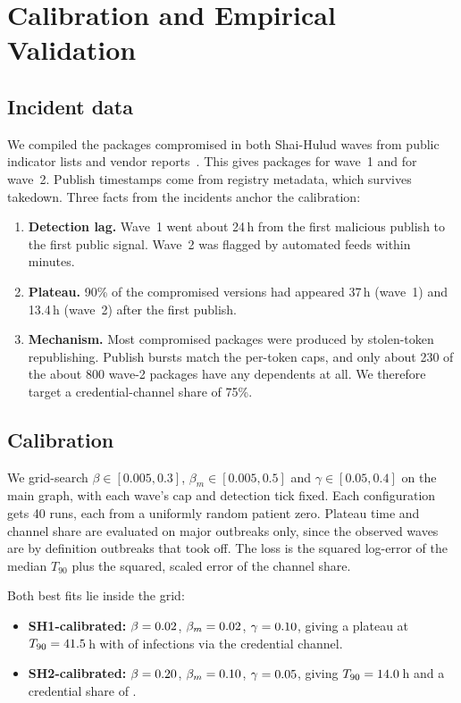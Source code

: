 \section{Calibration and Empirical Validation}\label{sec:calibration}

\subsection{Incident data}
We compiled the packages compromised in both Shai-Hulud waves from public indicator lists and vendor
reports~\citep{stepsecurity2025shaihulud,socket2025shaihulud,wiz2025shaihulud2,datadog2025shaihulud2}.
This gives \ValOneListed{} packages for wave~1 and \ValTwoListed{} for wave~2. Publish timestamps come
from registry metadata, which survives takedown. Three facts from the incidents anchor the calibration:
\begin{enumerate}
  \item \textbf{Detection lag.} Wave~1 went about 24\,h from the first malicious publish to the first
        public signal. Wave~2 was flagged by automated feeds within minutes.
  \item \textbf{Plateau.} 90\% of the compromised versions had appeared 37\,h (wave~1) and 13.4\,h
        (wave~2) after the first publish.
  \item \textbf{Mechanism.} Most compromised packages were produced by stolen-token republishing.
        Publish bursts match the per-token caps, and only about 230 of the about 800 wave-2 packages have
        any dependents at all. We therefore target a credential-channel share of 75\%.
\end{enumerate}

\subsection{Calibration}
We grid-search $\beta\in[0.005,0.3]$, $\beta_m\in[0.005,0.5]$ and $\gamma\in[0.05,0.4]$ on the main graph,
with each wave's cap and detection tick fixed. Each configuration gets 40 runs, each from a uniformly
random patient zero. Plateau time and channel share are evaluated on major outbreaks only, since the
observed waves are by definition outbreaks that took off. The loss is the squared log-error of the
median $T_{90}$ plus the squared, scaled error of the channel share.

Both best fits lie inside the grid:
\begin{itemize}
  \item \textbf{SH1-calibrated:} $\beta=0.02$, $\beta_m=0.02$, $\gamma=0.10$,
        giving a plateau at $T_{90}=41.5$\,h with \CalOneShare{} of infections via the
        credential channel.
  \item \textbf{SH2-calibrated:} $\beta=0.20$, $\beta_m=0.10$, $\gamma=0.05$,
        giving $T_{90}=14.0$\,h and a credential share of \CalTwoShare.
\end{itemize}

